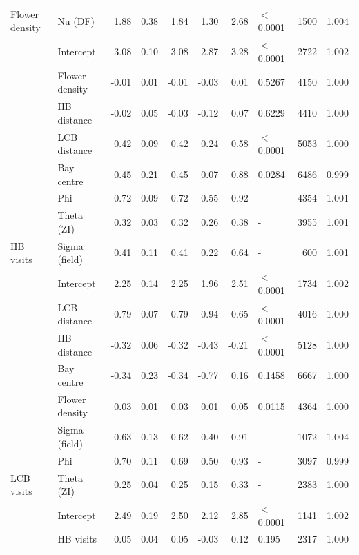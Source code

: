 \begin{longtable}{l|l|r|r|r|r|r|l|r|r}
\cline{2-10}
\multirow{-5}{*}{\raggedright\arraybackslash Flower density} & Nu (DF) & 1.88 & 0.38 & 1.84 & 1.30 & 2.68 & $<$0.0001 & 1500 & 1.004\\
\cline{1-10}
 & Intercept & 3.08 & 0.10 & 3.08 & 2.87 & 3.28 & $<$0.0001 & 2722 & 1.002\\
\cline{2-10}
 & Flower density & -0.01 & 0.01 & -0.01 & -0.03 & 0.01 & 0.5267 & 4150 & 1.000\\
\cline{2-10}
 & HB distance & -0.02 & 0.05 & -0.03 & -0.12 & 0.07 & 0.6229 & 4410 & 1.000\\
\cline{2-10}
 & LCB distance & 0.42 & 0.09 & 0.42 & 0.24 & 0.58 & $<$0.0001 & 5053 & 1.000\\
\cline{2-10}
 & Bay centre & 0.45 & 0.21 & 0.45 & 0.07 & 0.88 & 0.0284 & 6486 & 0.999\\
\cline{2-10}
 & Phi & 0.72 & 0.09 & 0.72 & 0.55 & 0.92 & - & 4354 & 1.001\\
\cline{2-10}
 & Theta (ZI) & 0.32 & 0.03 & 0.32 & 0.26 & 0.38 & - & 3955 & 1.001\\
\cline{2-10}
\multirow{-8}{*}{\raggedright\arraybackslash HB visits} & Sigma (field) & 0.41 & 0.11 & 0.41 & 0.22 & 0.64 & - & 600 & 1.001\\
\cline{1-10}
 & Intercept & 2.25 & 0.14 & 2.25 & 1.96 & 2.51 & $<$0.0001 & 1734 & 1.002\\
\cline{2-10}
 & LCB distance & -0.79 & 0.07 & -0.79 & -0.94 & -0.65 & $<$0.0001 & 4016 & 1.000\\
\cline{2-10}
 & HB distance & -0.32 & 0.06 & -0.32 & -0.43 & -0.21 & $<$0.0001 & 5128 & 1.000\\
\cline{2-10}
 & Bay centre & -0.34 & 0.23 & -0.34 & -0.77 & 0.16 & 0.1458 & 6667 & 1.000\\
\cline{2-10}
 & Flower density & 0.03 & 0.01 & 0.03 & 0.01 & 0.05 & 0.0115 & 4364 & 1.000\\
\cline{2-10}
 & Sigma (field) & 0.63 & 0.13 & 0.62 & 0.40 & 0.91 & - & 1072 & 1.004\\
\cline{2-10}
 & Phi & 0.70 & 0.11 & 0.69 & 0.50 & 0.93 & - & 3097 & 0.999\\
\cline{2-10}
\multirow{-8}{*}{\raggedright\arraybackslash LCB visits} & Theta (ZI) & 0.25 & 0.04 & 0.25 & 0.15 & 0.33 & - & 2383 & 1.000\\
\cline{1-10}
 & Intercept & 2.49 & 0.19 & 2.50 & 2.12 & 2.85 & $<$0.0001 & 1141 & 1.002\\
\cline{2-10}
 & HB visits & 0.05 & 0.04 & 0.05 & -0.03 & 0.12 & 0.195 & 2317 & 1.000\\

\end{longtable}
